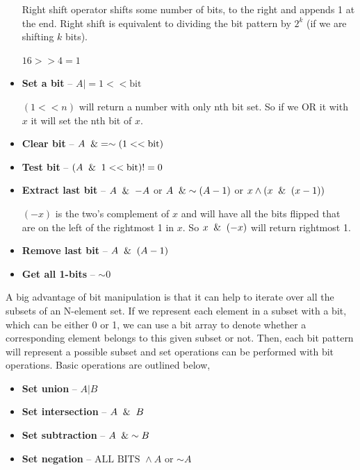 \documentclass{article}
\begin{document}
\begin{itemize}
        Right shift operator shifts some number of bits, to the right and appends 1 at the end. Right shift is equivalent to dividing the bit pattern by $2^k$ (if we are shifting $k$ bits).
        
        $16 >> 4 = 1$
        
        \item \textbf{Set a bit}  -- $A \vert= 1 <<  \text{bit}$
        
        $(1 << n)$ will return a number with only nth bit set. So if we OR it with $x$ it will set the nth bit of $x$.
        
        \item \textbf{Clear bit} -- $A \And = \sim (1 << \text{bit})$
        \item \textbf{Test bit} -- $(A \And 1 << \text{bit}) != 0$
        \item \textbf{Extract last bit} -- $A\And-A$ or $A \And \sim (A-1)$ or $x\wedge (x \And (x -1))$
        
        $(-x)$ is the two’s complement of $x$ and will have all the bits flipped that are on the left of the rightmost 1 in $x$. So $x \And (-x)$ will return rightmost 1.
        
        \item \textbf{Remove last bit} -- $A \And (A-1)$
        \item \textbf{Get all 1-bits} -- $\sim 0$
        
    \end{itemize}
    
    A big advantage of bit manipulation is that it can help to iterate over all the subsets of an N-element set. If we represent each element in a subset with a bit, which can be either 0 or 1, we can use a bit array to denote whether a corresponding element belongs to this given subset or not. Then, each bit pattern will represent a possible subset and set operations can be performed with bit operations. Basic operations are outlined below,
    
    \begin{itemize}
        \item \textbf{Set union} -- $A \vert B$
        \item \textbf{Set intersection} -- $A \And B$
        \item \textbf{Set subtraction} -- $A \And \sim B$
        \item \textbf{Set negation} -- $\text{ALL BITS } \wedge A$ or $\sim A$
    \end{itemize}
    
\end{document}
